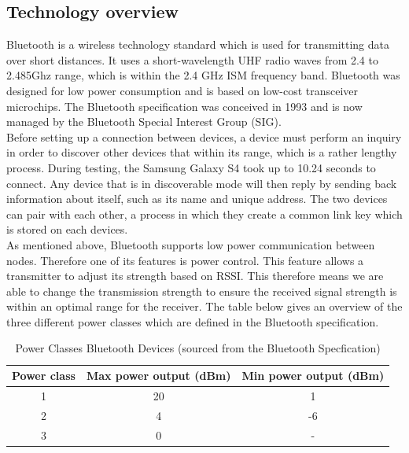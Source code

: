 \documentclass[12pt]{article}
\begin{document}
\subsection{Technology overview}
Bluetooth is a wireless technology standard which is used for transmitting data over short distances. It uses a short-wavelength UHF radio waves from 2.4 to 2.485Ghz range, which is within the 2.4 GHz ISM frequency band. Bluetooth was designed for low power consumption and is based on low-cost transceiver microchips. The Bluetooth specification was conceived in 1993 and is now managed by the Bluetooth Special Interest Group (SIG). \\

Before setting up a connection between devices, a device must perform an inquiry in order to discover other devices that within its range, which is a rather lengthy process. During testing, the Samsung Galaxy S4 took up to 10.24 seconds to connect. Any device that is in discoverable mode will then reply by sending back information about itself, such as its name and unique address. The two devices can pair with each other, a process in which they create a common link key which is stored on each devices. \\

As mentioned above, Bluetooth supports low power communication between nodes. Therefore one of its features is power control. This feature allows a transmitter to adjust its strength based on RSSI. This therefore means we are able to change the transmission strength to ensure the received signal strength is within an optimal range for the receiver. The table below gives an overview of the three different power classes which are defined in the Bluetooth specification. \\

\begin{table}[h]
\centering
\begin{tabular}{|c|c|c|}
\hline
\textbf{Power class} & \textbf{Max power output (dBm)} & \textbf{Min power output (dBm)} \\ \hline
1                    & 20                              & 1                               \\ \hline
2                    & 4                               & -6                              \\ \hline
3                    & 0                               & -                               \\ \hline
\end{tabular}
\caption{Power Classes Bluetooth Devices (sourced from the Bluetooth Specfication)}
\label{my-label}
\end{table}
\end{document}
